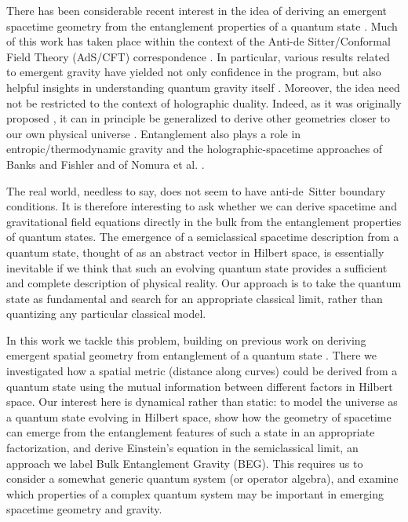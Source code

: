 \documentclass[%
preprint,
nofootinbib,
amsmath,amssymb,
aps,
prd,
showpacs,
superscriptaddress
]{revtex4-1}
\begin{document}
There has been considerable recent interest in the idea of deriving an emergent spacetime geometry from the entanglement properties of a quantum state \cite{Swingle:2009bg,VanRaamsdonk:2010pw,TNSGeo,Faulkner:2013ica,Faulkner:2017tkh,Czech:2015kbp}.
Much of this work has taken place within the context of the Anti-de Sitter/Conformal Field Theory (AdS/CFT) correspondence \cite{Maldacena:1997re}. In particular, various results related to emergent gravity  \cite{Faulkner:2013ica,Swingle:2014uza,Faulkner:2017tkh} have yielded not only confidence in the program, but also helpful insights in understanding quantum gravity itself  \cite{Maldacena:2013xja,Sanches:2016sxy}. Moreover, the idea need not be restricted to the context of holographic duality. Indeed, as it was originally proposed  \cite{VanRaamsdonk:2010pw}, it can in principle be generalized to derive other geometries closer to our own physical universe \cite{Susskind:2014moa,Cao:2016mst,Bao:2017iye,Bao:2017qmt,Susskind:2017ney}. Entanglement also plays a role in entropic/thermodynamic gravity \cite{Jacobson:1995ab,Padmanabhan:2009vy,Verlinde:2010hp,Jacobson:2015hqa,Carroll:2016lku,Verlinde:2016toy} and the holographic-spacetime approaches of Banks and Fishler \cite{Banks:2010tj,Banks:2011av,Banks:2015iya} and of Nomura et al. \cite{Nomura:2016aww,Nomura:2016ikr}.

The real world, needless to say, does not seem to have anti-de~Sitter boundary conditions.
It is therefore interesting to ask whether we can derive spacetime and gravitational field equations directly in the bulk from the entanglement properties of quantum states. 
The emergence of a semiclassical spacetime description from a quantum state, thought of as an abstract vector in Hilbert space, is essentially inevitable if we think that such an evolving quantum state provides a sufficient and complete description of physical reality.
Our approach is to take the quantum state as fundamental and search for an appropriate classical limit, rather than quantizing any particular classical model.

In this work we tackle this problem, building on previous work on deriving emergent spatial geometry from entanglement of a quantum state \cite{Cao:2016mst}.
There we investigated how a spatial metric (distance along curves) could be derived from a quantum state using the mutual information between different factors in Hilbert space.
Our interest here is dynamical rather than static: to model the universe as a quantum state evolving in Hilbert space, show how the geometry of spacetime can emerge from the entanglement features of such a state in an appropriate factorization, and derive Einstein's equation in the semiclassical limit, an approach we label Bulk Entanglement Gravity (BEG).
This requires us to consider a somewhat generic quantum system (or operator algebra), and examine which properties of a complex quantum system may be important in emerging spacetime geometry and gravity.
\end{document}
